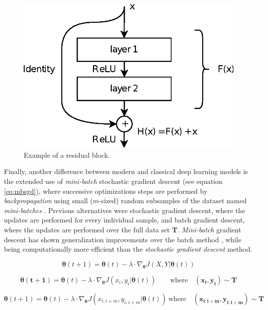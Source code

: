 \begin{figure}
	\centering
	\includegraphics[width=0.5\linewidth]{chapter2/images/residual}
	\caption{Example of a residual block.}
	\label{fig:residual}
\end{figure}


Finally, another difference between modern and classical deep learning models is the extended use of \textit{mini-batch} stochastic gradient descent (see equation \ref{eq:mbsgd}), where successive optimizations steps are performed by \textit{backpropagation} using small ($m$-sized) random subsamples of the dataset named \textit{mini-batches} \autocite{ruder2016}. Previous alternatives were stochastic gradient descent, where the updates are performed for every individual sample, and batch gradient descent, where the updates are performed over the full data set $\mathbf{T}$. \textit{Mini-batch} gradient descent has shown generalization improvements over the batch method \autocite{Hoffer2017}, while being computationally more efficient than the \textit{stochastic gradient descent} method.


\begin{equation}
	\label{eq:bgd}
	\mathbf{\theta}(t+1) = \mathbf{\theta}(t) - \lambda \cdot \nabla_\mathbf{\theta} J(X, Y|\mathbf{\theta}(t))
\end{equation}

\begin{equation}
	\label{eq:sgd}
	\mathbf{\theta(t+1)} = \mathbf{\theta}(t) - \lambda \cdot \nabla_\mathbf{\theta} J(x_i, y_i|\mathbf{\theta}(t)) \quad \mathrm \quad \mathrm{where} \quad (\mathbf{x_i}, \mathbf{y_i}) \sim \mathbf{T}
\end{equation}

\begin{equation}
	\label{eq:mbsgd}
	\mathbf{\theta}(t+1) = \mathbf{\theta}(t) - \lambda \cdot \nabla_\mathbf{\theta} J(x_{i:i+m}, y_{i:i+m}|\mathbf{\theta}(t)) \  \mathrm{where} \quad  (\mathbf{x_{i:i+m}}, \mathbf{y_{i:i+m}}) \sim \mathbf{T}
\end{equation}


